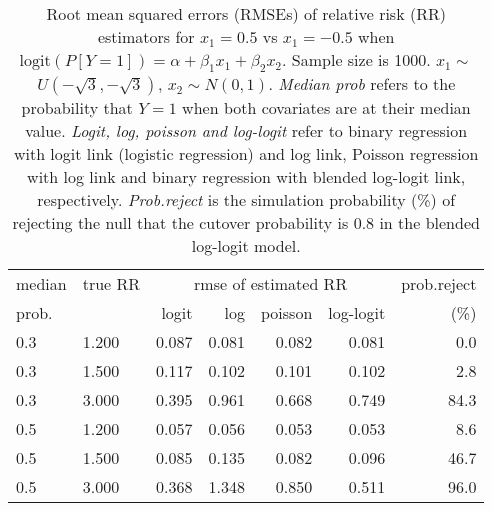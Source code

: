 \documentclass[12pt,a4paper]{article}
\begin{document}
\begin{table}[H] 
\small\sf\centering 
\caption{Root mean squared errors (RMSEs) of relative risk (RR) estimators for $x_1=0.5$ vs $x_1=-0.5$ when $\mbox{logit}(P[Y=1])=\alpha+\beta_1 x_1 + \beta_2 x_2$. Sample size is 1000. $x_1 \sim $$U(-\sqrt{3},-\sqrt{3})$, $x_2 \sim N(0,1)$. {\it Median prob} refers to the probability that $Y=1$ when both covariates are at their median value. {\it Logit, log, poisson and log-logit} refer to binary regression with logit link (logistic regression) and log link, Poisson regression with log link and binary regression with blended log-logit link, respectively. {\it Prob.reject} is the simulation probability (\%) of rejecting the null that the cutover probability is $0.8$ in the blended log-logit model.} 
\begin{tabular}{llrrrrr} 
\toprule 
median & true RR & \multicolumn{4}{c}{rmse of estimated RR} & prob.reject \\ 
prob. & & logit & log & poisson & log-logit  & (\%) \\ \midrule 
0.3 & 1.200 & 0.087 & 0.081 & 0.082 & 0.081 &  0.0 \\  
0.3 & 1.500 & 0.117 & 0.102 & 0.101 & 0.102 &  2.8 \\  
0.3 & 3.000 & 0.395 & 0.961 & 0.668 & 0.749 & 84.3 \\  
0.5 & 1.200 & 0.057 & 0.056 & 0.053 & 0.053 &  8.6 \\  
0.5 & 1.500 & 0.085 & 0.135 & 0.082 & 0.096 & 46.7 \\  
0.5 & 3.000 & 0.368 & 1.348 & 0.850 & 0.511 & 96.0 \\  
\bottomrule 
\end{tabular} 
\end{table} 
\end{document}
